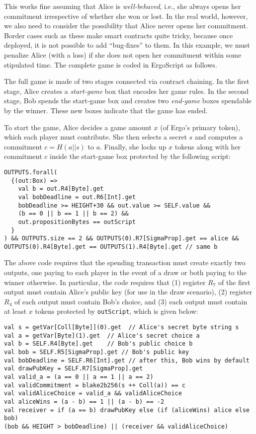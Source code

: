 \documentclass[runningheads]{llncs}
\newcommand{\langname}{ErgoScript\xspace}
\begin{document}
This works fine assuming that Alice is {\em well-behaved}, i.e., she always opens her commitment irrespective of whether she won or lost. In the real world, however, we also need to consider the possibility that Alice never opens her commitment. 
Border cases such as these make smart contracts quite tricky, because once deployed, it is not possible to add ``bug-fixes'' to them. In this example, we must penalize Alice (with a loss) if she does not open her commitment within some stipulated time.
The complete game is coded in \langname as follows.

The full game is made of two stages connected via contract chaining. In the first stage, Alice creates a {\em start-game} box that encodes her game rules. In the second stage, Bob spends the start-game box and creates two {\em end-game} boxes spendable by the winner. These new boxes indicate that the game has ended.

To start the game, Alice decides a game amount $x$ (of Ergo's primary token), which each player must contribute. She then selects a secret $s$ and computes a commitment $c=H(a||s)$ to $a$. Finally, she locks up $x$ tokens along with her commitment $c$ inside the start-game box protected by the following script:
\small{
	\begin{verbatim}
OUTPUTS.forall(
  {(out:Box) =>
    val b = out.R4[Byte].get
    val bobDeadline = out.R6[Int].get
    bobDeadline >= HEIGHT+30 && out.value >= SELF.value &&
    (b == 0 || b == 1 || b == 2) && 
    out.propositionBytes == outScript
  }
) && OUTPUTS.size == 2 && OUTPUTS(0).R7[SigmaProp].get == alice &&
OUTPUTS(0).R4[Byte].get == OUTPUTS(1).R4[Byte].get // same b
	\end{verbatim}
}


The above code requires that the spending transaction must create exactly two outputs, one paying to each player in the event of a draw or both paying to the winner otherwise. In particular, the code requires that (1) register $R_7$ of the first output must contain Alice's public key (for use in the draw scenario), (2) register $R_4$ of each output must contain Bob's choice, and (3) each output must contain at least $x$ tokens protected by \texttt{outScript}, which is given below:

\small{
\begin{verbatim}
val s = getVar[Coll[Byte]](0).get  // Alice's secret byte string s
val a = getVar[Byte](1).get  // Alice's secret choice a
val b = SELF.R4[Byte].get    // Bob's public choice b
val bob = SELF.R5[SigmaProp].get // Bob's public key
val bobDeadline = SELF.R6[Int].get // after this, Bob wins by default
val drawPubKey = SELF.R7[SigmaProp].get
val valid_a = (a == 0 || a == 1 || a == 2) 
val validCommitment = blake2b256(s ++ Coll(a)) == c   
val validAliceChoice = valid_a && validAliceChoice
val aliceWins = (a - b) == 1 || (a - b) == -2
val receiver = if (a == b) drawPubKey else (if (aliceWins) alice else bob)
(bob && HEIGHT > bobDeadline) || (receiver && validAliceChoice)
\end{verbatim}
}
\end{document}
